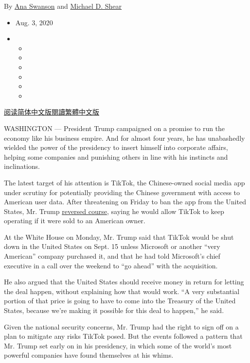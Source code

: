 By \href{https://www.nytimes.com/by/ana-swanson}{Ana Swanson} and
\href{https://www.nytimes.com/by/michael-d-shear}{Michael D. Shear}

\begin{itemize}
\item
  Aug. 3, 2020
\item
  \begin{itemize}
  \item
  \item
  \item
  \item
  \item
  \item
  \end{itemize}
\end{itemize}

\href{https://cn.nytimes.com/business/20200804/trump-tiktok-china-business/}{阅读简体中文版}\href{https://cn.nytimes.com/business/20200804/trump-tiktok-china-business/zh-hant/}{閱讀繁體中文版}

WASHINGTON --- President Trump campaigned on a promise to run the
economy like his business empire. And for almost four years, he has
unabashedly wielded the power of the presidency to insert himself into
corporate affairs, helping some companies and punishing others in line
with his instincts and inclinations.

The latest target of his attention is TikTok, the Chinese-owned social
media app under scrutiny for potentially providing the Chinese
government with access to American user data. After threatening on
Friday to ban the app from the United States, Mr. Trump
\href{https://www.nytimes.com/2020/08/03/technology/trump-tiktok-microsoft.html}{reversed
course}, saying he would allow TikTok to keep operating if it were sold
to an American owner.

At the White House on Monday, Mr. Trump said that TikTok would be shut
down in the United States on Sept. 15 unless Microsoft or another ``very
American'' company purchased it, and that he had told Microsoft's chief
executive in a call over the weekend to ``go ahead'' with the
acquisition.

He also argued that the United States should receive money in return for
letting the deal happen, without explaining how that would work. ``A
very substantial portion of that price is going to have to come into the
Treasury of the United States, because we're making it possible for this
deal to happen,'' he said.

Given the national security concerns, Mr. Trump had the right to sign
off on a plan to mitigate any risks TikTok posed. But the events
followed a pattern that Mr. Trump set early on in his presidency, in
which some of the world's most powerful companies have found themselves
at his whims.

